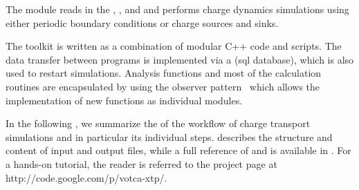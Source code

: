 The   module reads in the , , and  and performs charge dynamics simulations using either periodic boundary conditions or charge sources and sinks. 

The toolkit is written as a combination of modular C++ code and scripts. The data transfer between programs is implemented via a  (sql database), which is also used to restart simulations. Analysis functions and most of the calculation routines are encapsulated by using the observer pattern~\cite{gamma_design_1995} which allows the implementation of new functions as individual modules.

In the following , we summarize the  of the workflow of charge transport simulations and in particular its individual steps.  describes the structure and content of input and output files, while a full reference of  and  is available in . For a hands-on tutorial, the reader is referred to the \hyperref[http://code.google.com/p/votca-xtp/]{\votcaxtp} project page at http://code.google.com/p/votca-xtp/.



